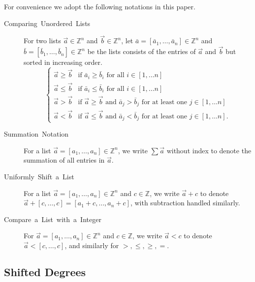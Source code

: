 For convenience we adopt the following notations in this paper. 
\begin{description}
\item [{Comparing~Unordered~Lists}] For two lists $\vec{a}\in\mathbb{Z}^{n}$
and $\vec{b}\in\mathbb{Z}^{n}$, let $\bar{a}=\left[\bar{a}_{1},\dots,\bar{a}_{n}\right]\in\mathbb{Z}^{n}$
and $\bar{b}=\left[\bar{b}_{1},\dots,\bar{b}_{n}\right]\in\mathbb{Z}^{n}$
be the lists consists of the entries of $\vec{a}$ and $\vec{b}$
but sorted in increasing order. 
\[
\begin{cases}
\vec{a}\ge\vec{b} & \mbox{if }\bar{a}_{i}\ge\bar{b}_{i}\mbox{ for all }i\in\left[1,\dots n\right]\\
\vec{a}\le\vec{b} & \mbox{if }\bar{a}_{i}\le\bar{b}_{i}\mbox{ for all }i\in\left[1,\dots n\right]\\
\vec{a}>\vec{b} & \mbox{if }\vec{a}\ge\vec{b}\mbox{ and }\bar{a}_{j}>\bar{b}_{j}\mbox{ for at least one }j\in\left[1,\dots n\right]\\
\vec{a}<\vec{b} & \mbox{if }\vec{a}\le\vec{b}\mbox{ and }\bar{a}_{j}<\bar{b}_{j}\mbox{ for at least one }j\in\left[1,\dots n\right].
\end{cases}
\]

\item [{Summation~Notation}] For a list $\vec{a}=\left[a_{1},\dots,a_{n}\right]\in\mathbb{Z}^{n}$,
we write $\sum\vec{a}$ without index to denote the summation of all
entries in $\vec{a}$. 
\item [{Uniformly~Shift~a~List}] For a list 
$\vec{a}=\left[a_{1},\dots,a_{n}\right]\in\mathbb{Z}^{n}$
and $c\in\mathbb{Z}$, we write $\vec{a}+c$ to denote $\vec{a}+\left[c,\dots,c\right]=\left[a_{1}+c,\dots,a_{n}+c\right]$, with subtraction handled similarly.
\item [{Compare~a~List~with~a~Integer}] For %
$\vec{a}=\left[a_{1},\dots,a_{n}\right]\in\mathbb{Z}^{n}$
and $c\in\mathbb{Z}$, we write $\vec{a}<c$ to denote $\vec{a}<\left[c,\dots,c\right]$,
and similarly for $>,\le,\ge,=$.
\end{description}

\subsection{Shifted Degrees}

